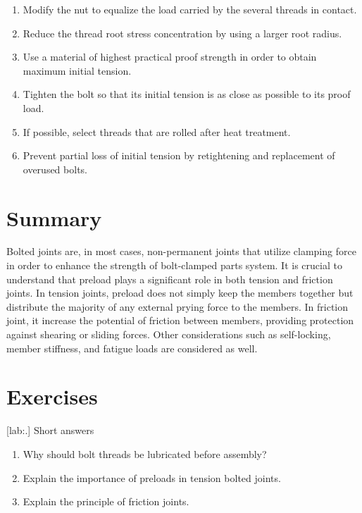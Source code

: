\documentclass[a4paper,openany,12pt]{book}
\begin{document}
{{\begin{enumerate}
\item Modify the nut to equalize the load carried by the several threads in
contact.

\item Reduce the thread root stress concentration by using a larger root
radius.

\item Use a material of highest practical proof strength in order to obtain
maximum initial tension.

\item Tighten the bolt so that its initial tension is as close as possible
to its proof load.

\item If possible, select threads that are rolled after heat treatment.

\item Prevent partial loss of initial tension by retightening and
replacement of overused bolts.
\end{enumerate}

\section{Summary}
\label{summary-7}
Bolted joints are, in most cases, non-permanent joints that utilize
clamping force in order to enhance the strength of bolt-clamped parts
system. It is crucial to understand that preload plays a significant
role in both tension and friction joints. In tension joints, preload
does not simply keep the members together but distribute the majority of
any external prying force to the members. In friction joint, it increase
the potential of friction between members, providing protection against
shearing or sliding forces. Other considerations such as self-locking,
member stiffness, and fatigue loads are considered as well.

\section{Exercises}
\label{exercises-7}
[lab:.] Short answers

\begin{enumerate}
\item Why should bolt threads be lubricated before assembly?

\item Explain the importance of preloads in tension bolted joints.

\item Explain the principle of friction joints.
\end{enumerate}

}}
\end{document}
